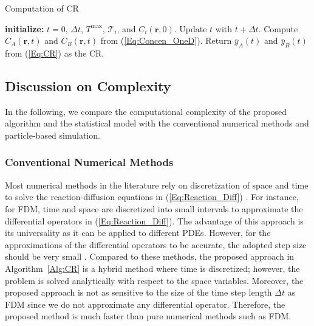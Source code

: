 \documentclass[conference]{IEEEtran}
\newtheorem{remk}{Remark}
\begin{document}
\begin{algorithm}[t]
\caption{Computation of CR}
 \begin{algorithmic}[1]\label{Alg:CR}
 \STATE \textbf{initialize:} $t=0$, $\Delta t$, $T^{\max}$, $\mathcal{T}_i$, and $C_{i}(\mathbf{r},0)$.   
              \STATE Update $t$ with  $t+\Delta t$.
        \STATE Compute $C_{A}(\mathbf{r},t)$ and $C_{B}(\mathbf{r},t)$ from (\ref{Eq:Concen_OneD}).
      \ENDWHILE
      \STATE Return $\bar{y}_A(t)$ and $\bar{y}_B(t)$ from (\ref{Eq:CR}) as the CR.
  \end{algorithmic}
\end{algorithm}





\subsection{Discussion on Complexity}\label{Sec:Complexity}

In the following, we compare the computational complexity of the proposed algorithm and the statistical model with the conventional numerical methods and particle-based simulation.

\subsubsection{Conventional Numerical Methods} Most numerical methods in the literature rely on discretization of space and time to solve the reaction-diffusion equations in (\ref{Eq:Reaction_Diff}) \cite{PDE_numerical,Nariman_Acid}. For instance, for FDM, time  and space are discretized into small intervals to approximate the differential operators in (\ref{Eq:Reaction_Diff}). The advantage of this approach is its universality as it can be applied to different PDEs. However, for the approximations of the differential operators to be accurate, the adopted step size should be very small \cite{PDE_numerical}. Compared to these methods, the proposed approach in Algorithm~\ref{Alg:CR} is a hybrid method where time is discretized; however, the problem is solved analytically with respect to the space variables. Moreover,  the proposed approach is not as sensitive  to the size of the time step length $\Delta t$ as FDM since we do not approximate any differential operator.  Therefore,  the proposed method is much faster than pure numerical methods such as FDM. 
\end{document}
